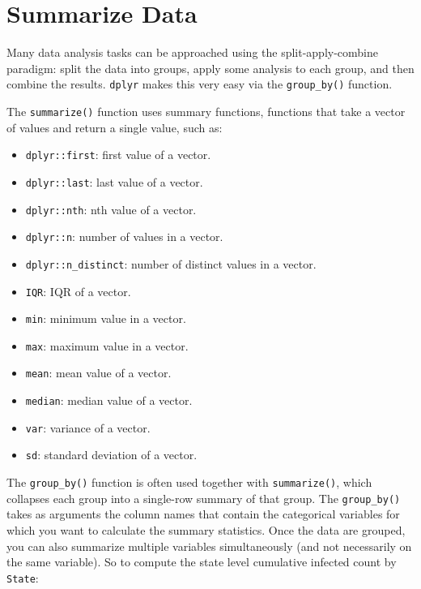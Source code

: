 \documentclass[]{book}
\providecommand{\tightlist}{%
  \setlength{\itemsep}{0pt}\setlength{\parskip}{0pt}}
\begin{document}
\section{Summarize Data}\label{summarize-data}

Many data analysis tasks can be approached using the split-apply-combine
paradigm: split the data into groups, apply some analysis to each group,
and then combine the results. \texttt{dplyr} makes this very easy via
the \texttt{group\_by()} function.

The \texttt{summarize()} function uses summary functions, functions that
take a vector of values and return a single value, such as:

\begin{itemize}
\tightlist
\item
  \texttt{dplyr::first}: first value of a vector.
\item
  \texttt{dplyr::last}: last value of a vector.
\item
  \texttt{dplyr::nth}: nth value of a vector.
\item
  \texttt{dplyr::n}: number of values in a vector.
\item
  \texttt{dplyr::n\_distinct}: number of distinct values in a vector.
\item
  \texttt{IQR}: IQR of a vector.
\item
  \texttt{min}: minimum value in a vector.
\item
  \texttt{max}: maximum value in a vector.
\item
  \texttt{mean}: mean value of a vector.
\item
  \texttt{median}: median value of a vector.
\item
  \texttt{var}: variance of a vector.
\item
  \texttt{sd}: standard deviation of a vector.
\end{itemize}

The \texttt{group\_by()} function is often used together with
\texttt{summarize()}, which collapses each group into a single-row
summary of that group. The \texttt{group\_by()} takes as arguments the
column names that contain the categorical variables for which you want
to calculate the summary statistics. Once the data are grouped, you can
also summarize multiple variables simultaneously (and not necessarily on
the same variable). So to compute the state level cumulative infected
count by \texttt{State}:
\end{document}
